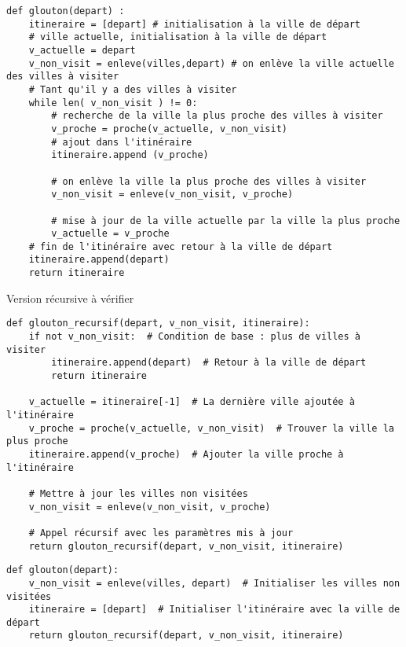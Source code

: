 \ifprof
\begin{corrige}
\begin{lstlisting}
def glouton(depart) :
    itineraire = [depart] # initialisation à la ville de départ
    # ville actuelle, initialisation à la ville de départ
    v_actuelle = depart 
    v_non_visit = enleve(villes,depart) # on enlève la ville actuelle des villes à visiter
    # Tant qu'il y a des villes à visiter
    while len( v_non_visit ) != 0: 
        # recherche de la ville la plus proche des villes à visiter
        v_proche = proche(v_actuelle, v_non_visit) 
        # ajout dans l'itinéraire 
        itineraire.append (v_proche) 
        
        # on enlève la ville la plus proche des villes à visiter
        v_non_visit = enleve(v_non_visit, v_proche) 
       
        # mise à jour de la ville actuelle par la ville la plus proche
        v_actuelle = v_proche 
    # fin de l'itinéraire avec retour à la ville de départ
    itineraire.append(depart) 
    return itineraire
\end{lstlisting}


Version récursive à vérifier
\begin{lstlisting}
def glouton_recursif(depart, v_non_visit, itineraire):
    if not v_non_visit:  # Condition de base : plus de villes à visiter
        itineraire.append(depart)  # Retour à la ville de départ
        return itineraire

    v_actuelle = itineraire[-1]  # La dernière ville ajoutée à l'itinéraire
    v_proche = proche(v_actuelle, v_non_visit)  # Trouver la ville la plus proche
    itineraire.append(v_proche)  # Ajouter la ville proche à l'itinéraire

    # Mettre à jour les villes non visitées
    v_non_visit = enleve(v_non_visit, v_proche)

    # Appel récursif avec les paramètres mis à jour
    return glouton_recursif(depart, v_non_visit, itineraire)
\end{lstlisting}

\begin{lstlisting}
def glouton(depart):
    v_non_visit = enleve(villes, depart)  # Initialiser les villes non visitées
    itineraire = [depart]  # Initialiser l'itinéraire avec la ville de départ
    return glouton_recursif(depart, v_non_visit, itineraire)
\end{lstlisting}

\end{corrige}
\else
\fi



